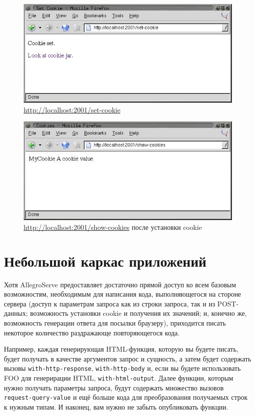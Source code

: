 \begin{figure}[htb]
  \centering
  \includegraphics[scale=0.7]{images/set-cookie.jpg}
  \caption{\url{http://localhost:2001/set-cookie}}
  \label{fig:26-8}
\end{figure}

\begin{figure}[htb]
  \centering
  \includegraphics[scale=0.7]{images/show-cookies-one-cookie.jpg}
  \caption{\url{http://localhost:2001/show-cookies} после установки cookie}
  \label{fig:26-9}
\end{figure}

\section{Небольшой каркас приложений}

Хотя AllegroServe предоставляет достаточно прямой доступ ко всем базовым возможностям,
необходимым для написания кода, выполняющегося на стороне сервера (доступ к параметрам
запроса как из строки запроса, так и из POST-данных; возможность установки cookie и
получения их значений; и, конечно же, возможность генерации ответа для посылки
браузеру), приходится писать некоторое количество раздражающе повторяющегося кода.

Например, каждая генерирующая HTML-функция, которую вы будете писать, будет получать в
качестве аргументов запрос и сущность, а затем будет содержать вызовы
\lstinline{with-http-response}, \lstinline{with-http-body} и, если вы будете использовать FOO
для генерирации HTML, \lstinline{with-html-output}. Далее функции, которым нужно получать
параметры запроса, будут содержать множество вызовов \lstinline{request-query-value} и ещё
больше кода для преобразования получаемых строк к нужным типам. И наконец, вам нужно не
забыть опубликовать функции.

